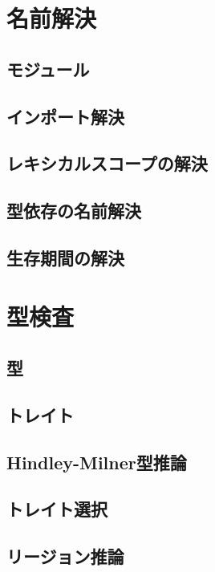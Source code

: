 \documentclass[dvipdfmx,uplatex,papersize,a4paper,10pt]{jsbook}
\theoremstyle{definition}
\begin{document}
\chapter{名前解決}

\section{モジュール}

\section{インポート解決}

\section{レキシカルスコープの解決}

\section{型依存の名前解決}

\section{生存期間の解決}



\chapter{型検査}

\section{型}

\section{トレイト}

\section{Hindley-Milner型推論}

\section{トレイト選択}

\section{リージョン推論}
\end{document}
